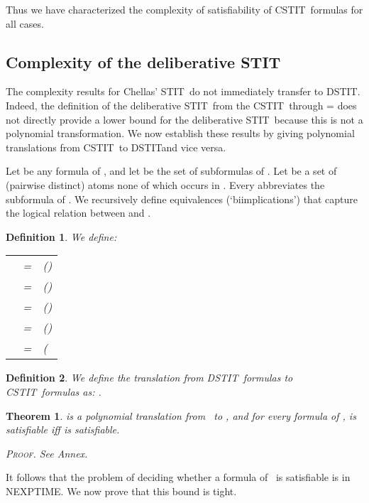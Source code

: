 \documentclass{article}
\newtheorem{definition}{Definition}
\newtheorem{theorem}{Theorem}
\newenvironment{pf}{\em \medskip\noindent \textsc{Proof.}}
{\hspace*{\fill}\nolinebreak[2]\hspace*{\fill}\medskip}
\newcommand{\STIT} {{\textsf{STIT}}}              \newcommand{\CSTIT}{{\textsf{CSTIT}}}            \newcommand{\DSTIT}{{\textsf{DSTIT}}}
\newcommand{\LCSTIT}{}
\newcommand{\LDSTIT}{}
\begin{document}
Thus we have characterized the complexity of satisfiability of \CSTIT\
formulas for all cases.


\goodbreak
\subsection{Complexity of the deliberative \STIT}

The complexity results for Chellas' \STIT\ do not immediately transfer to \DSTIT.
Indeed, the definition of the deliberative \STIT\ from the \CSTIT\ through
 = 
does not directly provide a lower bound for the deliberative \STIT\
because this is not a polynomial transformation.
We now establish these results by giving polynomial translations
from \CSTIT\ to \DSTIT and vice versa.


Let  be any formula of \LDSTIT, and
let  be the set of subformulas of .
Let  be a set of (pairwise distinct) atoms none of
which occurs in .
Every  abbreviates the subformula  of .
We recursively define equivalences (`biimplications') that capture
the logical relation between  and .

\begin{definition}
We define:
\begin{center}
\begin{tabular}{lll}
 &         = &  ()\\
 & = & ()\\
& =  & ()\\
 & = & ()\\
 & = & (
\end{tabular}
\end{center}
\end{definition}

\begin{definition}
We define the translation  from \DSTIT\ formulas to \CSTIT\ formulas as:
.
\end{definition}


\begin{theorem}\label{theo:dstitNexptHard}
 is a polynomial translation from \LDSTIT\ to \LCSTIT, and
for every formula  of \LDSTIT,
 is satisfiable iff  is satisfiable.

\begin{pf}
See Annex.
\end{pf}
\end{theorem}

It follows that the problem of deciding whether a formula of \LDSTIT\ is
satisfiable is in NEXPTIME.
We now prove that this bound is tight.
\end{document}
